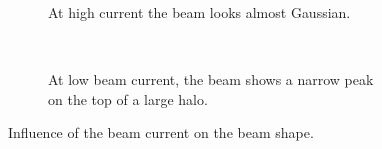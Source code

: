 \begin{figure}[!ht]
  \begin{subfigure}[t]{0.5\textwidth}
    
    \caption{At high current the beam looks almost Gaussian.}
    \label{chap4:ex_beam_profile_a}
  \end{subfigure}
  ~
  \begin{subfigure}[t]{0.5\textwidth}
    
    \caption{At low beam current, the beam shows a narrow peak on the top of a large halo.}
    \label{chap4:ex_beam_profile_b}
  \end{subfigure}
  \caption[Influence of the beam current on the beam shape.]{Influence of the beam current on the beam shape.}
  \label{chap4:ex_beam_profile}
\end{figure}
